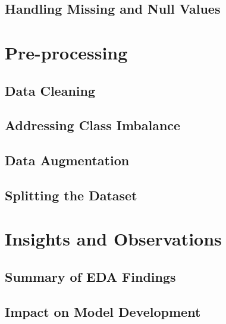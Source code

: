 \subsection{Handling Missing and Null Values}
\label{subsec:chap2 section 1.6}

\section{Pre-processing}
\label{sec:chap2 section 2}

\subsection{Data Cleaning}
\label{subsec:chap2 section 2.1}

\subsection{Addressing Class Imbalance}
\label{subsec:chap2 section 2.2}

\subsection{Data Augmentation}
\label{subsec:chap2 section 2.3}

\subsection{Splitting the Dataset}
\label{subsec:chap2 section 2.4}

\section{Insights and Observations}
\label{sec:chap2 section 3}

\subsection{Summary of EDA Findings}
\label{subsec:chap2 section 3.1}

\subsection{Impact on Model Development}
\label{subsec:chap2 section 3.2}
